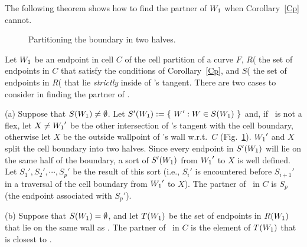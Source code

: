 The following theorem shows how to find the partner of $\mbox{$W_{1}$}$ when Corollary~\ref{Cp} cannot.

\begin{figure}[htb]\vspace{2.1in}\caption{Partitioning the boundary in 
two halves.}\label{3.8A}\end{figure}

\begin{theorem}
\label{Tpner}
Let $\mbox{$W_{1}$}$ be an endpoint in cell $C$ of the cell partition of a curve $F$,
$R${\rm (}\wo{\rm )} the set of endpoints
in $C$ that satisfy the conditions of 
Corollary~{\rm \ref{Cp}},
%
and $S${\rm (}\wo{\rm )} 
the set of endpoints in $R${\rm (}\wo{\rm )} that lie {\em strictly} inside of \wo's 
tangent.
There are two cases to consider in finding the partner of \wo.

{\rm (a)} Suppose that $S(\mbox{$W_{1}$}) \neq \emptyset$. 
Let \mbox{$S'(\mbox{$W_{1}$}) := \{\ W':W \in S(\mbox{$W_{1}$})\ \}$} and, 
if \wo\ is not a flex, let $X \neq \mbox{$W_{1}$} '$ be the other intersection of \wo's 
tangent with the cell boundary, otherwise let $X$ be the outside wallpoint of \wo's 
wall w.r.t.\ $C$ {\rm (}Fig.~\ref{3.8A}{\rm )}.
$\mbox{$W_{1}$} '$ and $X$ split the cell boundary into two halves.
Since every endpoint in $S'(\mbox{$W_{1}$})$ will lie on the same half of the boundary,
a sort of $S'(\mbox{$W_{1}$})$ from $\mbox{$W_{1}$} '$ to $X$ is well defined.
Let $S_{1}',S_{2}',\cdots,S_{p}'$ be the result of this sort
{\rm (}i.e., $S_{i}'$ is encountered before $S_{i+1}'$ in a traversal of the cell boundary 
from $\mbox{$W_{1}$} '$ to $X${\rm )}.
The partner of \wo\ in $C$ is $S_{p}$ {\rm (}the endpoint associated with $S_{p}'${\rm )}.

{\rm (b)} Suppose that $S(\mbox{$W_{1}$}) = \emptyset$, and 
let $T(\mbox{$W_{1}$})$ be the set of endpoints in $R(\mbox{$W_{1}$})$ that lie on 
the same wall as \wo.
The partner of \wo\ in $C$ is the element of $T(\mbox{$W_{1}$})$ that is closest to \wo.
\end{theorem}

